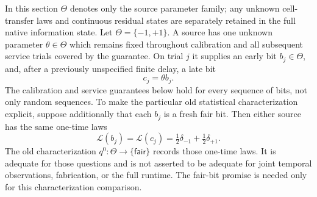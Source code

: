 \documentclass[11pt]{article}
\theoremstyle{definition}
\theoremstyle{remark}
\begin{document}
In this section $\Theta$ denotes only the source parameter family; any
unknown cell-transfer laws and continuous residual states are separately
retained in the full native information state. Let
$\Theta=\{-1,+1\}$. A source has one unknown parameter $\theta\in\Theta$
which remains fixed throughout calibration and all subsequent service
trials covered by the guarantee. On trial $j$ it supplies an early bit
$b_j\in\Theta$, and, after a previously unspecified finite delay, a late bit
\begin{equation}\label{arc:eq:source-law}
                 c_j=\theta b_j.
\end{equation}
The calibration and service guarantees below hold for every sequence of
bits, not only random sequences. To make the particular old statistical
characterization explicit, suppose additionally that each $b_j$ is a fresh
fair bit. Then either source has the same one-time laws
\[
 \mathcal L(b_j)=\mathcal L(c_j)=\tfrac12\delta_{-1}+\tfrac12\delta_{+1}.
\]
The old characterization $q^0:\Theta\to\{\mathsf{fair}\}$ records those
one-time laws. It is adequate for those questions and is not asserted to be
adequate for joint temporal observations, fabrication, or the full runtime.
The fair-bit promise is needed only for this characterization comparison.
\end{document}
